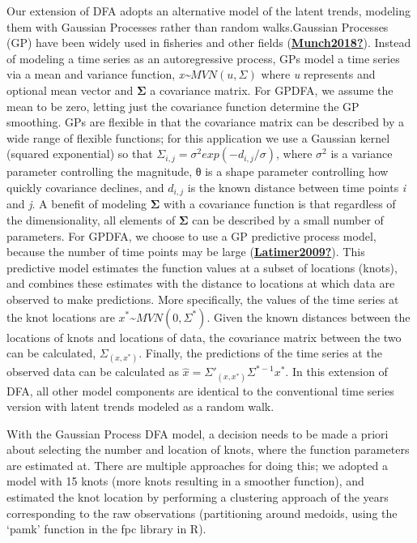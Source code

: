 \documentclass [11pt, proquest] {uwthesis}[2015/03/03]
\begin{document}
Our extension of DFA adopts an alternative model of the latent trends, modeling them with Gaussian Processes rather than random walks.Gaussian Processes (GP) have been widely used in fisheries and other fields (\protect\hyperlink{ref-Munch2018}{\textbf{Munch2018?}}). Instead of modeling a time series as an autoregressive process, GPs model a time series via a mean and variance function, \emph{x\textasciitilde{}}\(MVN(u,\Sigma)\) where \emph{u} represents and optional mean vector and \textbf{Σ} a covariance matrix. For GPDFA, we assume the mean to be zero, letting just the covariance function determine the GP smoothing. GPs are flexible in that the covariance matrix can be described by a wide range of flexible functions; for this application we use a Gaussian kernel (squared exponential) so that \(\Sigma_{i,j}=\sigma^2 exp(-d_{i,j}/\sigma)\), where \(\sigma^2\) is a variance parameter controlling the magnitude, θ is a shape parameter controlling how quickly covariance declines, and \(d_{i,j}\) is the known distance between time points \emph{i} and \emph{j}. A benefit of modeling \textbf{Σ} with a covariance function is that regardless of the dimensionality, all elements of \textbf{Σ} can be described by a small number of parameters. For GPDFA, we choose to use a GP predictive process model, because the number of time points may be large (\protect\hyperlink{ref-Latimer2009}{\textbf{Latimer2009?}}). This predictive model estimates the function values at a subset of locations (knots), and combines these estimates with the distance to locations at which data are observed to make predictions. More specifically, the values of the time series at the knot locations are \(x^*\)\textasciitilde{}\(MVN(0,\Sigma^*)\). Given the known distances between the locations of knots and locations of data, the covariance matrix between the two can be calculated, \(\Sigma_{(x,x^*)}\). Finally, the predictions of the time series at the observed data can be calculated as \(\hat{x}=\Sigma'_{(x,x^*)}\Sigma^{*-1}x^*\). In this extension of DFA, all other model components are identical to the conventional time series version with latent trends modeled as a random walk.

With the Gaussian Process DFA model, a decision needs to be made a priori about selecting the number and location of knots, where the function parameters are estimated at. There are multiple approaches for doing this; we adopted a model with 15 knots (more knots resulting in a smoother function), and estimated the knot location by performing a clustering approach of the years corresponding to the raw observations (partitioning around medoids, using the `pamk' function in the fpc library in R).
\end{document}
